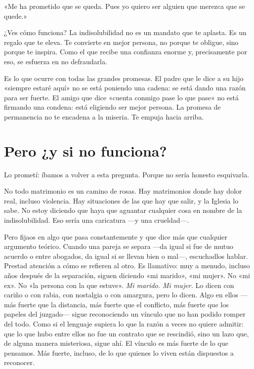 «Me ha prometido que se queda. Pues yo quiero ser alguien que merezca que se quede.»

¿Ves cómo funciona? La indisolubilidad no es un mandato que te aplasta. Es un regalo que te eleva. Te convierte en mejor persona, no porque te obligue, sino porque te inspira. Como el que recibe una confianza enorme y, precisamente por eso, se esfuerza en no defraudarla.

Es lo que ocurre con todas las grandes promesas. El padre que le dice a su hijo «siempre estaré aquí» no se está poniendo una cadena: se está dando una razón para ser fuerte. El amigo que dice «cuenta conmigo pase lo que pase» no está firmando una condena: está eligiendo ser mejor persona. La promesa de permanencia no te encadena a la miseria. Te empuja hacia arriba.

\section{Pero ¿y si no funciona?}

Lo prometí: íbamos a volver a esta pregunta. Porque no sería honesto esquivarla.

No todo matrimonio es un camino de rosas. Hay matrimonios donde hay dolor real, incluso violencia. Hay situaciones de las que hay que salir, y la Iglesia lo sabe. No estoy diciendo que haya que aguantar cualquier cosa en nombre de la indisolubilidad. Eso sería una caricatura ---y una crueldad---.

Pero fijaos en algo que pasa constantemente y que dice más que cualquier argumento teórico. Cuando una pareja se separa ---da igual si fue de mutuo acuerdo o entre abogados, da igual si se llevan bien o mal---, escuchadlos hablar. Prestad atención a cómo se refieren al otro. Es llamativo: muy a menudo, incluso años después de la separación, siguen diciendo «mi marido», «mi mujer». No «mi ex». No «la persona con la que estuve». \emph{Mi marido. Mi mujer.} Lo dicen con cariño o con rabia, con nostalgia o con amargura, pero lo dicen. Algo en ellos ---más fuerte que la distancia, más fuerte que el conflicto, más fuerte que los papeles del juzgado--- sigue reconociendo un vínculo que no han podido romper del todo. Como si el lenguaje supiera lo que la razón a veces no quiere admitir: que lo que hubo entre ellos no fue un contrato que se rescindió, sino un lazo que, de alguna manera misteriosa, sigue ahí. El vínculo es más fuerte de lo que pensamos. Más fuerte, incluso, de lo que quienes lo viven están dispuestos a reconocer.

